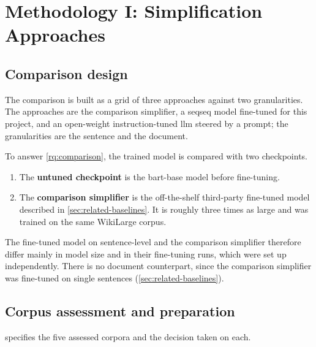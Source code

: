 \chapter{Methodology I: Simplification Approaches}
\label{sec:methodology-i}

\section{Comparison design}
\label{sec:comparison-design}

The comparison is built as a grid of three approaches against two granularities.
The approaches are the comparison simplifier, a \gls{seqseq} model fine-tuned for this project, and an open-weight instruction-tuned \gls{llm} steered by a prompt; the granularities are the sentence and the document.

To answer \cref{rq:comparison}, the trained model is compared with two checkpoints.
\begin{enumerate}
	\item The \textbf{untuned checkpoint} is the \gls{bart}-base model before fine-tuning.
	\item The \textbf{comparison simplifier} is the off-the-shelf third-party fine-tuned model described in \cref{sec:related-baselines}.
	      It is roughly three times as large and was trained on the same WikiLarge corpus.
\end{enumerate}

The fine-tuned model on sentence-level and the comparison simplifier therefore differ mainly in model size and in their fine-tuning runs, which were set up independently.
There is no document counterpart, since the comparison simplifier was fine-tuned on single sentences (\cref{sec:related-baselines}).

\section{Corpus assessment and preparation}
\label{sec:corpus-preparation}

 specifies the five assessed corpora and the decision taken on each.

